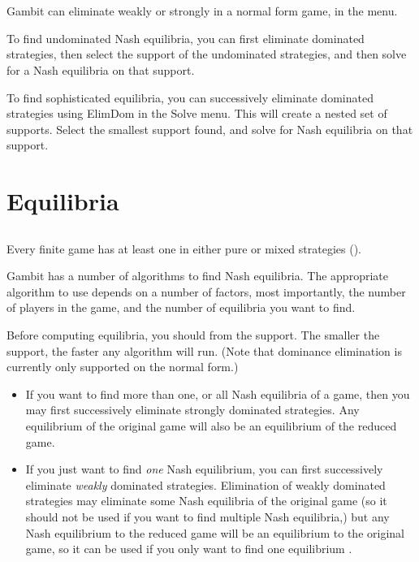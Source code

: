 \section{}\label{domsec}

Gambit can eliminate weakly or strongly 
 in a 
normal form game, in the  menu.  

To find undominated Nash equilibria, you can first eliminate dominated 
strategies, then select the support of the undominated strategies, and then 
solve for a Nash equilibria on that support.  

To find sophisticated equilibria, you can successively eliminate 
dominated strategies using ElimDom in the Solve menu.  This will 
create a nested set of supports.  
Select the smallest support found, and solve for Nash equilibria on that 
support.  

\section{Equilibria}

\subsection{}\label{nashsec}
Every finite game has at least one  in either pure or mixed strategies (\cite{Nash:1950}).  

Gambit has a number of algorithms to find Nash equilibria.  
The appropriate algorithm to use 
depends on a number of factors, most importantly, the number of players in the 
game, and the number of equilibria you want to find. 

Before computing equilibria, you should 
 from 
the support.  The smaller the support, the faster any algorithm will run.  (Note that 
dominance elimination is currently only supported on the normal form.) 
\begin{itemize}
\item 
If you want to find more than one, or all Nash equilibria of a game, then you may first 
successively eliminate strongly dominated strategies.  Any equilibrium of the original 
game will also be an equilibrium of the reduced game. 
\item 
If you just want to find {\em one} Nash equilibrium, you can first successively eliminate 
{\em weakly} dominated strategies.  Elimination of weakly dominated strategies may 
eliminate some Nash equilibria of the original game (so it should not be used if you 
want to find multiple Nash equilibria,) but any Nash equilibrium to the reduced 
game will be an equilibrium to the original game, so it can be used if you only 
want to find one equilibrium .  
\end{itemize}

